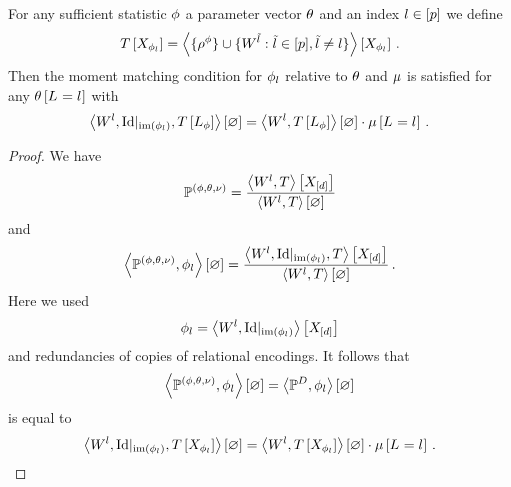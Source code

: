 \begin{lemma}
    \label{lem:mmContractionEquation}
    For any sufficient statistic $\phi$ a parameter vector $\theta$ and an index $l\in[p]$ we define
    \begin{align*}
        T\left[X_{\phi_{l}}\right]
        = \left\langle \{\rho^{\phi}\}\cup\{W^{\tilde{l}} : \tilde{l} \in [p], \tilde{l}\neq l\}\right\rangle \left[ X_{\phi_{l}} \right] \, .
    \end{align*}
    Then the moment matching condition for $\phi_{l}$ relative to $\theta$ and $\mu$ is satisfied for any $\theta\left[L_{}=l_{}\right]$ with
    \begin{align*}
        \left\langle W^{l}, {\mathrm{Id}}|_{\mathrm{im}\left(\phi_{l}\right)}, T\left[L_\phi\right]\right\rangle \left[ \varnothing \right]
        = \left\langle W^{l}, T\left[L_\phi\right]\right\rangle \left[ \varnothing \right] \cdot \mu\left[L_{}=l_{}\right] \, .
    \end{align*}
\end{lemma}
\begin{proof}
    We have
    \begin{align*}
        \mathbb{P}^{(\phi,\theta,\nu)} = \frac{
            \left\langle W^{l}, T\right\rangle \left[ X_{[d]} \right]
        }{
            \left\langle W^{l}, T\right\rangle \left[ \varnothing \right]
        }
    \end{align*}
    and
    \begin{align*}
        \left\langle \mathbb{P}^{(\phi,\theta,\nu)}, \phi_{l}\right\rangle \left[ \varnothing \right]
        = \frac{
            \left\langle W^{l}, {\mathrm{Id}}|_{\mathrm{im}\left(\phi_{l}\right)}, T\right\rangle \left[ X_{[d]} \right]
        }{
            \left\langle W^{l}, T\right\rangle \left[ \varnothing \right]
        } \, .
    \end{align*}
    Here we used
    \[ \phi_{l} = \left\langle W^{l}, {\mathrm{Id}}|_{\mathrm{im}\left(\phi_{l}\right)}\right\rangle \left[ X_{[d]} \right] \]
    and redundancies of copies of relational encodings.
    It follows that
    \begin{align*}
        \left\langle \mathbb{P}^{(\phi,\theta,\nu)},\phi_{l}\right\rangle \left[ \varnothing \right] = \left\langle \mathbb{P}^{D},\phi_{l}\right\rangle \left[ \varnothing \right]
    \end{align*}
    is equal to
    \begin{align*}
        \left\langle W^{l}, {\mathrm{Id}}|_{\mathrm{im}\left(\phi_{l}\right)}, T\left[X_{\phi_{l}}\right]\right\rangle \left[ \varnothing \right]
        = \left\langle W^{l},T\left[X_{\phi_{l}}\right]\right\rangle \left[ \varnothing \right] \cdot \mu\left[L_{}=l_{}\right] \, .
    \end{align*}
\end{proof}

